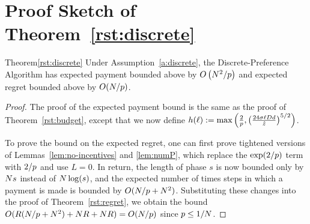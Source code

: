 \section{Proof Sketch of Theorem~\ref{rst:discrete}}
\label{sec:discussion-proof1}

\begin{rtheorem}{Theorem}{\ref{rst:discrete}}
Under Assumption~\ref{a:discrete}, the Discrete-Preference Algorithm
has expected payment bounded above by 
$O \left(N^2/p \right)$
and expected regret bounded above by $O(N / p)$.
\end{rtheorem}

\begin{proof}
The proof of the expected payment bound is the same as the proof of
Theorem~\ref{rst:budget},
except that we now define
$h(\ell) := \max \left( \frac{2}{p},
\left( \frac{24 \sigma \ell D d}{\hat{z}} \right)^{5/2} \right)$.

To prove the bound on the expected regret,
one can first prove tightened versions of Lemmas~\ref{lem:no-incentives} and \ref{lem:numP},
which replace the $\exp(2/p)$ term with $2/p$ and use $L=0$.
In return, the length of phase $s$ is now bounded only by $N s$
instead of $N \log(s)$,
and the expected number of times steps in which a payment is made is bounded by
$O(N/p + N^2)$.
Substituting these changes into the proof of Theorem~\ref{rst:regret},
we obtain the bound $O(R(N/p + N^2) + N R +
N R) = O(N/p)$ since $p \le 1/N$.
\end{proof}



